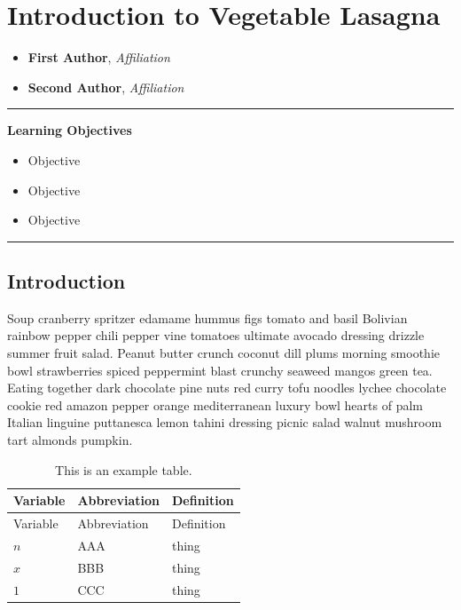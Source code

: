 \documentclass{book}
\providecommand{\tightlist}{%
  \setlength{\itemsep}{0pt}\setlength{\parskip}{0pt}}
\begin{document}
\hypertarget{introduction-to-vegetable-lasagna}{%
\chapter{Introduction to Vegetable
Lasagna}\label{introduction-to-vegetable-lasagna}}

\begin{itemize}
\tightlist
\item
  \textbf{First Author}, \emph{Affiliation}
\item
  \textbf{Second Author}, \emph{Affiliation}
\end{itemize}

\begin{center}\rule{0.5\linewidth}{0.5pt}\end{center}

\textbf{Learning Objectives}

\begin{itemize}
\tightlist
\item
  Objective
\item
  Objective
\item
  Objective
\end{itemize}

\begin{center}\rule{0.5\linewidth}{0.5pt}\end{center}

\hypertarget{introduction-1}{%
\section{Introduction}\label{introduction-1}}

Soup cranberry spritzer edamame hummus figs tomato and basil Bolivian rainbow
pepper chili pepper vine tomatoes ultimate avocado dressing drizzle summer
fruit salad. Peanut butter crunch coconut dill plums morning smoothie bowl
strawberries spiced peppermint blast crunchy seaweed mangos green tea. Eating
together dark chocolate pine nuts red curry tofu noodles lychee chocolate
cookie red amazon pepper orange mediterranean luxury bowl hearts of palm
Italian linguine puttanesca lemon tahini dressing picnic salad walnut mushroom
tart almonds pumpkin.

\hypertarget{tbl:variables}{}
\begin{longtable}[]{@{}lll@{}}
\caption{\label{tbl:variables}This is an example table.}\tabularnewline
\toprule
Variable & Abbreviation & Definition \\
\midrule
\endfirsthead
\toprule
Variable & Abbreviation & Definition \\
\midrule
\endhead
\(n\) & AAA & thing \\
\(x\) & BBB & thing \\
\(1\) & CCC & thing \\
\bottomrule
\end{longtable}
\end{document}

